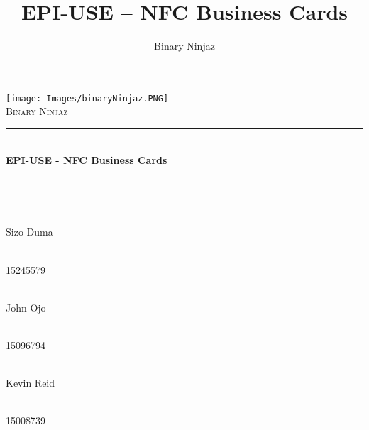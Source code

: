 \documentclass[11pt]{article}
\author{Binary Ninjaz}
\title{EPI-USE -- NFC Business Cards}
\begin{document}
\begin{titlepage}
	
	\begin{center}
        \texttt{[image: Images/binaryNinjaz.PNG]}\\[1cm] 
		\textsc{\LARGE Binary Ninjaz}\\[0.3cm]
		\rule{\linewidth}{0.5mm} \\[1cm]
		{ \huge \bfseries EPI-USE - NFC Business Cards}\\[0.5cm]
		\rule{\linewidth}{0.5mm} \\[1cm] 		
  
		
		\begin{minipage}{0.4\textwidth}
			\begin{flushleft} \large
				\emph{} \\
				Sizo {Duma}
			\end{flushleft}
		\end{minipage}
		\begin{minipage}{0.4\textwidth}
			\begin{flushright} \large
				\emph{} \\
				15245579
			\end{flushright}
		\end{minipage}

		\begin{minipage}{0.4\textwidth}
			\begin{flushleft} \large
            	\emph{} \\
				John {Ojo}
			\end{flushleft}
		\end{minipage}
		\begin{minipage}{0.4\textwidth}
			\begin{flushright} \large
				\emph{} \\
				15096794 
			\end{flushright}
		\end{minipage}
		
		\begin{minipage}{0.4\textwidth}
			\begin{flushleft} \large
				\emph{} \\
				Kevin Reid
			\end{flushleft}
		\end{minipage}
		\begin{minipage}{0.4\textwidth}
			\begin{flushright} \large
				\emph{} \\
				15008739
			\end{flushright}
		\end{minipage}


\end{center}
\end{titlepage}
\end{document}
